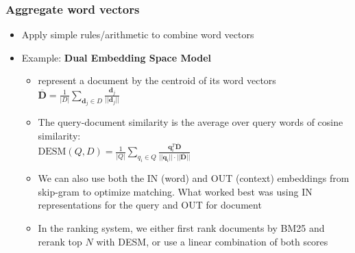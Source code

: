 \subsubsection{Aggregate word vectors}
\begin{itemize}
	\item Apply simple rules/arithmetic to combine word vectors
	\item Example: \textbf{Dual Embedding Space Model} 
	\begin{itemize}
		\item represent a document by the centroid of its word vectors $\bm{\overline{D}} = \frac{1}{|D|}\sum_{\bm{d}_j \in D} \frac{\bm{d}_j}{||\bm{d}_j||}$
		\item The query-document similarity is the average over query words of cosine similarity:\\ $\text{DESM}(Q,D) = \frac{1}{|Q|}\sum_{q_i \in Q} \frac{\bm{q}_i^T \bm{\overline{D}}}{||\bm{q}_i|| \cdot ||\bm{\overline{D}}||}$
		\item We can also use both the IN (word) and OUT (context) embeddings from skip-gram to optimize matching. What worked best was using IN representations for the query and OUT for document
		\item In the ranking system, we either first rank documents by BM25 and rerank top $N$ with DESM, or use a linear combination of both scores
	\end{itemize}
\end{itemize}
